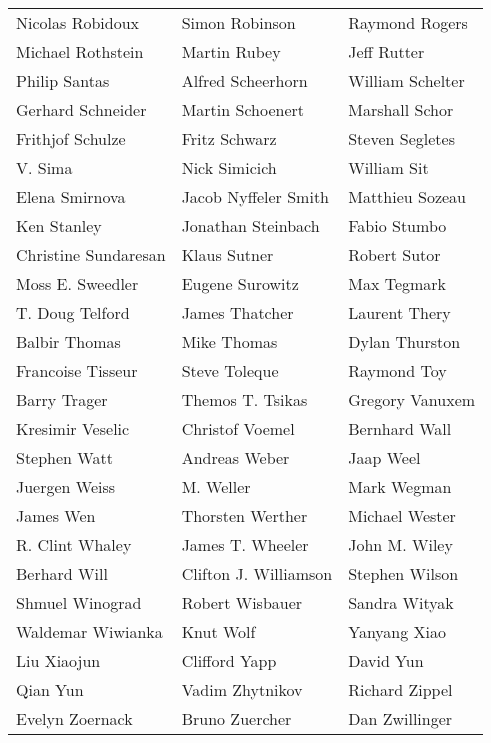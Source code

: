 \begin{tabular}{lll}
Nicolas Robidoux       & Simon Robinson         & Raymond Rogers\\
Michael Rothstein      & Martin Rubey           & Jeff Rutter\\
Philip Santas          & Alfred Scheerhorn      & William Schelter\\
Gerhard Schneider      & Martin Schoenert       & Marshall Schor\\
Frithjof Schulze       & Fritz Schwarz          & Steven Segletes\\
V. Sima                & Nick Simicich          & William Sit\\
Elena Smirnova         & Jacob Nyffeler Smith   & Matthieu Sozeau\\
Ken Stanley            & Jonathan Steinbach     & Fabio Stumbo\\
Christine Sundaresan   & Klaus Sutner           & Robert Sutor\\
Moss E. Sweedler       & Eugene Surowitz        & Max Tegmark\\
T. Doug Telford        & James Thatcher         & Laurent Thery\\
Balbir Thomas          & Mike Thomas            & Dylan Thurston\\
Francoise Tisseur      & Steve Toleque          & Raymond Toy\\
Barry Trager           & Themos T. Tsikas       & Gregory Vanuxem\\
Kresimir Veselic       & Christof Voemel        & Bernhard Wall\\
Stephen Watt           & Andreas Weber          & Jaap Weel\\
Juergen Weiss          & M. Weller              & Mark Wegman\\
James Wen              & Thorsten Werther       & Michael Wester\\
R. Clint Whaley        & James T. Wheeler       & John M. Wiley\\
Berhard Will           & Clifton J. Williamson  & Stephen Wilson\\
Shmuel Winograd        & Robert Wisbauer        & Sandra Wityak\\
Waldemar Wiwianka      & Knut Wolf              & Yanyang Xiao\\
Liu Xiaojun            & Clifford Yapp          & David Yun\\
Qian Yun               & Vadim Zhytnikov        & Richard Zippel\\
Evelyn Zoernack        & Bruno Zuercher         & Dan Zwillinger\\
\end{tabular}
\newpage

